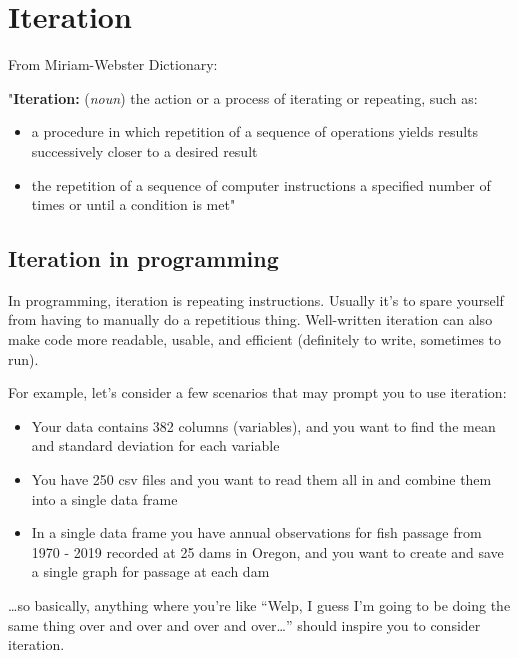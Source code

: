 \documentclass[
]{book}
\providecommand{\tightlist}{%
  \setlength{\itemsep}{0pt}\setlength{\parskip}{0pt}}
\begin{document}
\hypertarget{iteration}{%
\chapter{Iteration}\label{iteration}}

From Miriam-Webster Dictionary:

"\textbf{Iteration:} (\emph{noun}) the action or a process of iterating or repeating, such as:

\begin{itemize}
\tightlist
\item
  a procedure in which repetition of a sequence of operations yields results successively closer to a desired result
\item
  the repetition of a sequence of computer instructions a specified number of times or until a condition is met"
\end{itemize}

\hypertarget{iteration-in-programming}{%
\section{Iteration in programming}\label{iteration-in-programming}}

In programming, iteration is repeating instructions. Usually it's to spare yourself from having to manually do a repetitious thing. Well-written iteration can also make code more readable, usable, and efficient (definitely to write, sometimes to run).

For example, let's consider a few scenarios that may prompt you to use iteration:

\begin{itemize}
\tightlist
\item
  Your data contains 382 columns (variables), and you want to find the mean and standard deviation for each variable
\item
  You have 250 csv files and you want to read them all in and combine them into a single data frame
\item
  In a single data frame you have annual observations for fish passage from 1970 - 2019 recorded at 25 dams in Oregon, and you want to create and save a single graph for passage at each dam
\end{itemize}

\ldots so basically, anything where you're like ``Welp, I guess I'm going to be doing the same thing over and over and over and over\ldots{}'' should inspire you to consider iteration.
\end{document}
